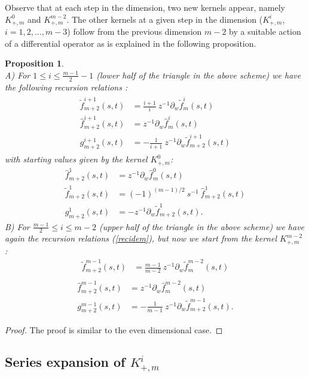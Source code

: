 \documentclass{amsart}
\newtheorem{proposition}[theorem]{Proposition}
\theoremstyle{remark}
\begin{document}
Observe that at each step in the dimension, two new kernels appear, namely $K_{+,m}^0$ and $K_{+,m}^{m-2}$. The other kernels at a given step in the dimension ($K_{+,m}^i$, $i=1,2,\ldots,m-3$) follow from the previous dimension $m-2$ by a suitable action of a differential operator as is explained in the following proposition. 

\begin{proposition}~\\
A) For $1 \leq i \leq \frac{m-1}{2} - 1$ (lower half of the triangle in the above scheme) we have the following recursion relations :
\begin{align}\label{recidem}
\begin{split}
\tilde{f}_{m+2}^{i+1}(s,t) &=  \frac{i+1}{i} \ z^{-1} \partial_w \tilde{f}_m^i(s,t)\\
\hat{f}_{m+2}^{i+1}(s,t) &=   z^{-1} \partial_w \hat{f}_m^i(s,t) \\
g^{i+1}_{m+2}(s,t) &=  - \frac{1}{i+1} \ z^{-1} \partial_w \tilde{f}_{m+2}^{i+1}(s,t)
\end{split}
\end{align}
with starting values given by the kernel $K_{+,m}^0$:
\begin{align*}
\hat{f}^1_{m+2}(s,t) &=  z^{-1} \partial_w \hat{f}_m^0(s,t)\\
\tilde{f}^1_{m+2}(s,t) &=  (-1)^{(m-1)/2} \ s^{-1} \ \hat{f}^1_{m+2}(s,t)\\
g^1_{m+2}(s,t) &=  - z^{-1} \partial_w \tilde{f}^1_{m+2}(s,t) .
\end{align*}
B) For $\frac{m-1}{2} \leq i \leq m-2$ (upper half of the triangle in the above scheme) we have again the recursion relations (\ref{recidem}), but now we start from the kernel $K_{+,m}^{m-2}$ :
\begin{align*}
\tilde{f}_{m+2}^{m-1}(s,t) &=  \frac{m-1}{m-2} \ z^{-1} \partial_w \tilde{f}_m^{m-2}(s,t)\\
\end{align*}
\begin{align*}
\hat{f}_{m+2}^{m-1}(s,t) &=   z^{-1} \partial_w \hat{f}_m^{m-2}(s,t) \\
g^{m-1}_{m+2}(s,t) &=  - \frac{1}{m-1} \ z^{-1} \partial_w \tilde{f}_{m+2}^{m-1}(s,t).
\end{align*}
\end{proposition}
\begin{proof}
The proof is similar to the even dimensional case.
\end{proof}
\subsection{Series expansion of $K_{+,m}^i$}
\end{document}
